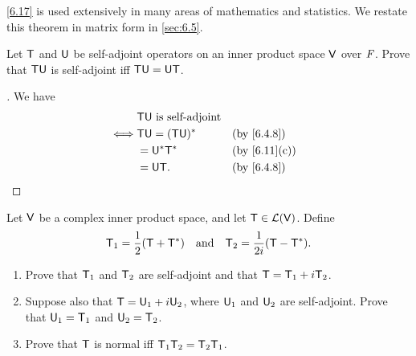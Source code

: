 \begin{note}
  \cref{6.17} is used extensively in many areas of mathematics and statistics.
  We restate this theorem in matrix form in \cref{sec:6.5}.
\end{note}

\exercisesection

\setcounter{ex}{3}
\begin{ex}\label{ex:6.4.4}
  Let \(\mathsf{T}\) and \(\mathsf{U}\) be self-adjoint operators on an inner product space \(\mathsf{V}\) over \(\mathit{F}\).
  Prove that \(\mathsf{T} \mathsf{U}\) is self-adjoint iff \(\mathsf{T} \mathsf{U} = \mathsf{U} \mathsf{T}\).
\end{ex}

\begin{proof}[]
  We have
  \begin{align*}
         & \T \U \text{ is self-adjoint}                   \\
    \iff & \T \U = (\T \U)^*             &  & \by{6.4.8}   \\
         & = \U^* \T^*                   &  & \by{6.11}[c] \\
         & = \U \T.                      &  & \by{6.4.8}
  \end{align*}
\end{proof}

\setcounter{ex}{5}
\begin{ex}\label{ex:6.4.6}
  Let \(\mathsf{V}\) be a complex inner product space, and let \(\mathsf{T} \in \mathcal{L}(\mathsf{V})\).
  Define
  \[
    \mathsf{T}_1 = \dfrac{1}{2} (\mathsf{T} + \mathsf{T}^*) \quad \text{and} \quad \mathsf{T}_2 = \dfrac{1}{2i} (\mathsf{T} - \mathsf{T}^*).
  \]
  \begin{enumerate}
    \item Prove that \(\mathsf{T}_1\) and \(\mathsf{T}_2\) are self-adjoint and that \(\mathsf{T} = \mathsf{T}_1 + i \mathsf{T}_2\).
    \item Suppose also that \(\mathsf{T} = \mathsf{U}_1 + i \mathsf{U}_2\), where \(\mathsf{U}_1\) and \(\mathsf{U}_2\) are self-adjoint.
          Prove that \(\mathsf{U}_1 = \mathsf{T}_1\) and \(\mathsf{U}_2 = \mathsf{T}_2\).
    \item Prove that \(\mathsf{T}\) is normal iff \(\mathsf{T}_1 \mathsf{T}_2 =  \mathsf{T}_2 \mathsf{T}_1\).
  \end{enumerate}
\end{ex}

